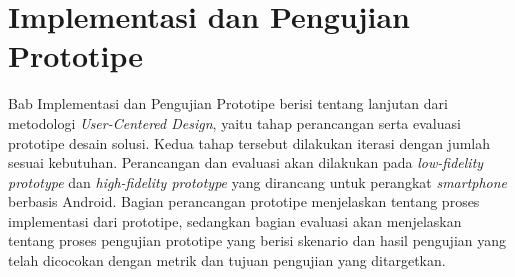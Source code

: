 \chapter{Implementasi dan Pengujian Prototipe}

Bab Implementasi dan Pengujian Prototipe berisi tentang lanjutan dari metodologi \textit{User-Centered Design}, yaitu tahap perancangan serta evaluasi prototipe desain solusi. Kedua tahap tersebut dilakukan iterasi dengan jumlah sesuai kebutuhan. Perancangan dan evaluasi akan dilakukan pada \textit{low-fidelity prototype} dan \textit{high-fidelity prototype} yang dirancang untuk perangkat \textit{smartphone} berbasis Android. Bagian perancangan prototipe menjelaskan tentang proses implementasi dari prototipe, sedangkan bagian evaluasi akan menjelaskan tentang proses pengujian prototipe yang berisi skenario dan hasil pengujian yang telah dicocokan dengan metrik dan tujuan pengujian yang ditargetkan. 









\newpage




\newpage




